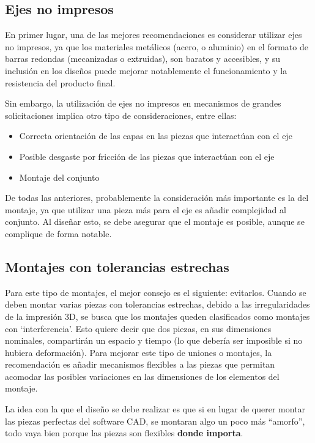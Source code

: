 \subsection{Ejes no impresos}
En primer lugar, una de las mejores recomendaciones es considerar utilizar ejes no impresos, ya que los materiales metálicos (acero, o aluminio) en el formato de barras redondas (mecanizadas o extruidas), son baratos y accesibles, y su inclusión en los diseños puede mejorar notablemente el funcionamiento y la resistencia del producto final.
\par Sin embargo, la utilización de ejes no impresos en mecanismos de grandes solicitaciones implica otro tipo de consideraciones, entre ellas:
\begin{itemize}
	\item Correcta orientación de las capas en las piezas que interactúan con el eje
	\item Posible desgaste por fricción de las piezas que interactúan con el eje
	\item Montaje del conjunto
\end{itemize}
De todas las anteriores, probablemente la consideración más importante es la del montaje, ya que utilizar una pieza más para el eje es añadir complejidad al conjunto. Al diseñar esto, se debe asegurar que el montaje es posible, aunque se complique de forma notable.

\subsection{Montajes con tolerancias estrechas}
Para este tipo de montajes, el mejor consejo es el siguiente: evitarlos. Cuando se deben montar varias piezas con tolerancias estrechas, debido a las irregularidades de la impresión 3D, se busca que los montajes queden clasificados como montajes con `interferencia'. Esto quiere decir que dos piezas, en sus dimensiones nominales, compartirán un espacio y tiempo (lo que debería ser imposible si no hubiera deformación). Para mejorar este tipo de uniones o montajes, la recomendación es añadir mecanismos flexibles a las piezas que permitan acomodar las posibles variaciones en las dimensiones de los elementos del montaje. 
\par La idea con la que el diseño se debe realizar es que si en lugar de querer montar las piezas perfectas del software CAD, se montaran algo un poco más ``amorfo'', todo vaya bien porque las piezas son flexibles \textbf{donde importa}.

